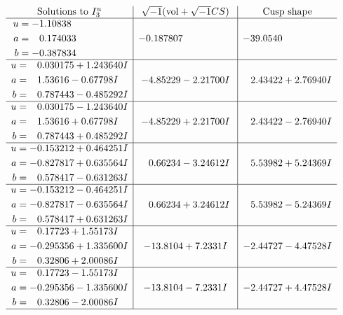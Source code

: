 \documentclass[1p]{elsarticle_modified}
\theoremstyle{definition}
\newcommand{\I}{\sqrt{-1}}
\begin{document}
$$\begin{array}{c|c|c}  
\text{Solutions to }I^u_{3}& \I (\text{vol} + \sqrt{-1}CS) & \text{Cusp shape}\\
 \hline 
\begin{aligned}
u &= -1.10838\phantom{ +0.000000I} \\
a &= \phantom{-}0.174033\phantom{ +0.000000I} \\
b &= -0.387834\phantom{ +0.000000I}\end{aligned}
 & -0.187807\phantom{ +0.000000I} & -39.0540\phantom{ +0.000000I} \\ \hline\begin{aligned}
u &= \phantom{-}0.030175 + 1.243640 I \\
a &= \phantom{-}1.53616 - 0.67798 I \\
b &= \phantom{-}0.787443 - 0.485292 I\end{aligned}
 & -4.85229 - 2.21700 I & \phantom{-}2.43422 + 2.76940 I \\ \hline\begin{aligned}
u &= \phantom{-}0.030175 - 1.243640 I \\
a &= \phantom{-}1.53616 + 0.67798 I \\
b &= \phantom{-}0.787443 + 0.485292 I\end{aligned}
 & -4.85229 + 2.21700 I & \phantom{-}2.43422 - 2.76940 I \\ \hline\begin{aligned}
u &= -0.153212 + 0.464251 I \\
a &= -0.827817 + 0.635564 I \\
b &= \phantom{-}0.578417 - 0.631263 I\end{aligned}
 & \phantom{-}0.66234 - 3.24612 I & \phantom{-}5.53982 + 5.24369 I \\ \hline\begin{aligned}
u &= -0.153212 - 0.464251 I \\
a &= -0.827817 - 0.635564 I \\
b &= \phantom{-}0.578417 + 0.631263 I\end{aligned}
 & \phantom{-}0.66234 + 3.24612 I & \phantom{-}5.53982 - 5.24369 I \\ \hline\begin{aligned}
u &= \phantom{-}0.17723 + 1.55173 I \\
a &= -0.295356 + 1.335600 I \\
b &= \phantom{-}0.32806 + 2.00086 I\end{aligned}
 & -13.8104 + 7.2331 I & -2.44727 - 4.47528 I \\ \hline\begin{aligned}
u &= \phantom{-}0.17723 - 1.55173 I \\
a &= -0.295356 - 1.335600 I \\
b &= \phantom{-}0.32806 - 2.00086 I\end{aligned}
 & -13.8104 - 7.2331 I & -2.44727 + 4.47528 I\\
 \hline 
 \end{array}$$\newpage\newpage\renewcommand{\arraystretch}{1}
\end{document}
